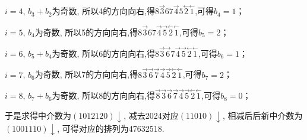 \documentclass[UTF8,oneside]{article}
\begin{document}
$i=4$, $b_3+b_2$为奇数, 所以4的方向向右,得$
    \overset{}{8}\overset{\rightarrow}{3}\overset{}{6}\overset{}{7}\overset{\rightarrow}{4}\overset{}{5}\overset{\leftarrow}{2}\overset{\leftarrow}{1}
$,可得$b_4=1$；

$i=5$, $b_4$为奇数, 所以5的方向向右,得$
    \overset{}{8}\overset{\rightarrow}{3}\overset{}{6}\overset{}{7}\overset{\rightarrow}{4}\overset{\rightarrow}{5}\overset{\leftarrow}{2}\overset{\leftarrow}{1}
$,可得$b_5=2$；

$i=6$, $b_5+b_4$为奇数, 所以6的方向向右,得$
    \overset{}{8}\overset{\rightarrow}{3}\overset{\rightarrow}{6}\overset{}{7}\overset{\rightarrow}{4}\overset{\rightarrow}{5}\overset{\leftarrow}{2}\overset{\leftarrow}{1}
$,可得$b_6=1$；

$i=7$, $b_6$为奇数, 所以7的方向向右,得$
    \overset{}{8}\overset{\rightarrow}{3}\overset{\rightarrow}{6}\overset{\rightarrow}{7}\overset{\rightarrow}{4}\overset{\rightarrow}{5}\overset{\leftarrow}{2}\overset{\leftarrow}{1}
$,可得$b_7=2$；

$i=8$, $b_7+b_6$为奇数, 所以8的方向向右,得$
    \overset{\rightarrow}{8}\overset{\rightarrow}{3}\overset{\rightarrow}{6}\overset{\rightarrow}{7}\overset{\rightarrow}{4}\overset{\rightarrow}{5}\overset{\leftarrow}{2}\overset{\leftarrow}{1}
$,可得$b_8=0$；

于是求得中介数为$(1012120)\downarrow$, 减去2024对应$(11010)\downarrow$, 相减后后新中介数为$(1001110)\downarrow$, 可得对应的排列为47632518.
\end{document}
